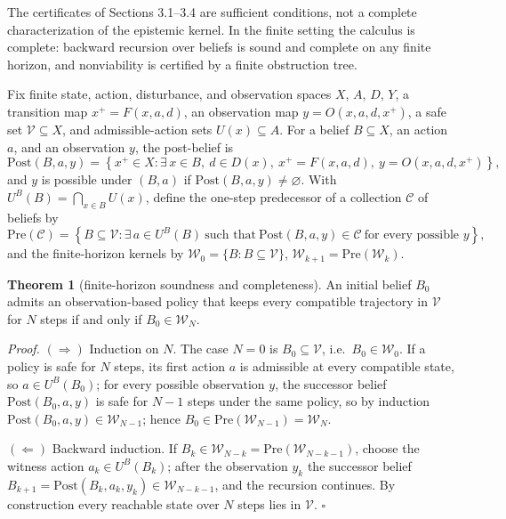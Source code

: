 \documentclass[11pt]{article}
\theoremstyle{definition}
\newtheorem{theorem}{Theorem}
\begin{document}
The certificates of Sections 3.1--3.4 are sufficient conditions, not a
complete characterization of the epistemic kernel. In the finite setting
the calculus is complete: backward recursion over beliefs is sound and
complete on any finite horizon, and nonviability is certified by a
finite obstruction tree.

Fix finite state, action, disturbance, and observation spaces \(X\),
\(A\), \(D\), \(Y\), a transition map \(x^+ = F(x,a,d)\), an observation
map \(y = O(x,a,d,x^+)\), a safe set \(\mathcal V\subseteq X\), and
admissible-action sets \(U(x)\subseteq A\). For a belief \(B\subseteq X\),
an action \(a\), and an observation \(y\), the post-belief is
\[\mathrm{Post}(B,a,y) = \left\{ x^+\in X : \exists\, x\in B,\ d\in D(x),\ x^+ = F(x,a,d),\ y = O(x,a,d,x^+) \right\},\]
and \(y\) is possible under \((B,a)\) if \(\mathrm{Post}(B,a,y)\neq\varnothing\).
With \(U^B(B)=\bigcap_{x\in B}U(x)\), define the one-step predecessor of a
collection \(\mathcal C\) of beliefs by
\[\mathrm{Pre}(\mathcal C) = \left\{ B\subseteq\mathcal V : \exists\, a\in U^B(B)\ \text{such that}\ \mathrm{Post}(B,a,y)\in\mathcal C\ \text{for every possible } y \right\},\]
and the finite-horizon kernels by \(\mathcal W_0 = \{B : B\subseteq\mathcal V\}\),
\(\mathcal W_{k+1} = \mathrm{Pre}(\mathcal W_k)\).

\begin{theorem}[finite-horizon soundness and completeness]\label{thm:finite-horizon}
An initial belief \(B_0\) admits an observation-based policy that keeps
every compatible trajectory in \(\mathcal V\) for \(N\) steps if and only
if \(B_0\in\mathcal W_N\).
\end{theorem}

\emph{Proof.} \((\Rightarrow)\) Induction on \(N\). The case \(N=0\) is
\(B_0\subseteq\mathcal V\), i.e.\ \(B_0\in\mathcal W_0\). If a policy is
safe for \(N\) steps, its first action \(a\) is admissible at every
compatible state, so \(a\in U^B(B_0)\); for every possible observation
\(y\), the successor belief \(\mathrm{Post}(B_0,a,y)\) is safe for \(N-1\)
steps under the same policy, so by induction
\(\mathrm{Post}(B_0,a,y)\in\mathcal W_{N-1}\); hence
\(B_0\in\mathrm{Pre}(\mathcal W_{N-1})=\mathcal W_N\).

\((\Leftarrow)\) Backward induction. If \(B_k\in\mathcal W_{N-k} =
\mathrm{Pre}(\mathcal W_{N-k-1})\), choose the witness action
\(a_k\in U^B(B_k)\); after the observation \(y_k\) the successor belief
\(B_{k+1}=\mathrm{Post}(B_k,a_k,y_k)\in\mathcal W_{N-k-1}\), and the
recursion continues. By construction every reachable state over \(N\)
steps lies in \(\mathcal V\). \ensuremath{\square}
\end{document}
